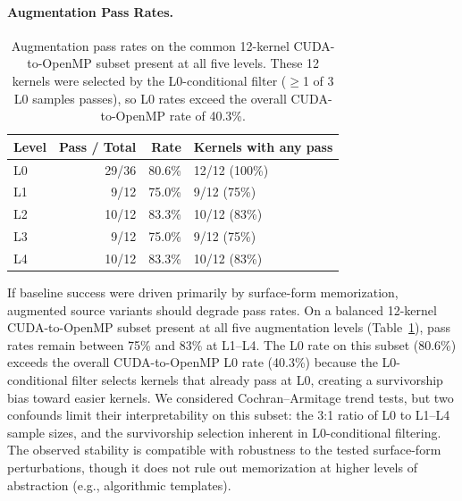 \paragraph{Augmentation Pass Rates.}
\begin{table}[h]
\centering
\caption{Augmentation pass rates on the common 12-kernel CUDA-to-OpenMP subset present at all five levels. These 12 kernels were selected by the L0-conditional filter ($\geq$1 of 3 L0 samples passes), so L0 rates exceed the overall CUDA-to-OpenMP rate of 40.3\%.}
\label{tab:aug-balanced}
\small
\begin{tabular}{@{}lrrl@{}}
\toprule
Level & Pass / Total & Rate & Kernels with any pass \\
\midrule
L0 & 29/36 & 80.6\% & 12/12 (100\%) \\
L1 &  9/12 & 75.0\% &  9/12 \phantom{0}(75\%) \\
L2 & 10/12 & 83.3\% & 10/12 \phantom{0}(83\%) \\
L3 &  9/12 & 75.0\% &  9/12 \phantom{0}(75\%) \\
L4 & 10/12 & 83.3\% & 10/12 \phantom{0}(83\%) \\
\bottomrule
\end{tabular}
\end{table}

If baseline success were driven primarily by surface-form memorization, augmented source variants should degrade pass rates. On a balanced 12-kernel CUDA-to-OpenMP subset present at all five augmentation levels (Table~\ref{tab:aug-balanced}), pass rates remain between 75\% and 83\% at L1--L4. The L0 rate on this subset (80.6\%) exceeds the overall CUDA-to-OpenMP L0 rate (40.3\%) because the L0-conditional filter selects kernels that already pass at L0, creating a survivorship bias toward easier kernels. We considered Cochran--Armitage trend tests, but two confounds limit their interpretability on this subset: the 3:1 ratio of L0 to L1--L4 sample sizes, and the survivorship selection inherent in L0-conditional filtering. The observed stability is compatible with robustness to the tested surface-form perturbations, though it does not rule out memorization at higher levels of abstraction (e.g., algorithmic templates).




\clearpage %
